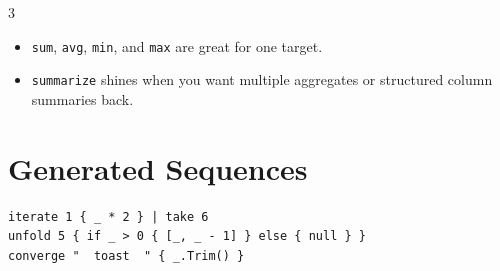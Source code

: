 \begin{multicols*}{3}
\begin{itemize}
\item \texttt{sum}, \texttt{avg}, \texttt{min}, and \texttt{max} are great for one target.
\item \texttt{summarize} shines when you want multiple aggregates or structured column summaries back.
\end{itemize}

\section{Generated Sequences}
\begin{lstlisting}
iterate 1 { _ * 2 } | take 6
unfold 5 { if _ > 0 { [_, _ - 1] } else { null } }
converge "  toast  " { _.Trim() }
\end{lstlisting}


\end{multicols*}

